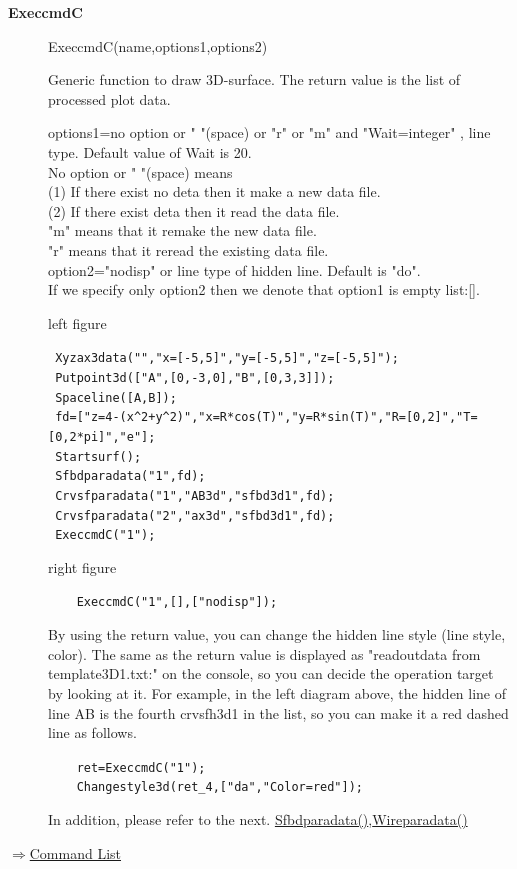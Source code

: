 \documentclass[papersize,a4paper,12pt]{article}
\newenvironment{cmd}[2]{
\hypertarget{#2}{}
\begin{center}{\bf\large #1}\end{center}
\begin{description}
}{
\end{description}
\begin{flushright} \hyperlink{functionlist}{$\Rightarrow$Command List}\end{flushright}
}
\newcommand{\itemket}[1]{
\item[\Ltab{27mm}{#1}]
}
\begin{document}
\begin{cmd}{ExeccmdC}{execcmdc}

\itemket{Usage}ExeccmdC(name,options1,options2)
\itemket{Description}Generic function to draw 3D-surface. The return value is the list of processed plot data.
\itemket{Details}options1=no option or " "(space) or "r" or "m" and "Wait=integer" , line type. Default value of Wait is 20.\\
No option or " "(space) means\\
(1) If there exist no deta then it make a new data file.\\
(2) If there exist deta then it read the data file.\\
"m" means that it remake the new data file.\\
"r" means that it reread the existing data file.\\

option2="nodisp" or line type of hidden line. Default is "do".\\

If we specify only option2 then we denote that option1 is empty list:[].
\itemket{Examples}  \mbox{}

left figure

\verb| Xyzax3data("","x=[-5,5]","y=[-5,5]","z=[-5,5]"); |\\
\verb| Putpoint3d(["A",[0,-3,0],"B",[0,3,3]]); |\\
\verb| Spaceline([A,B]); |\\
\verb| fd=["z=4-(x^2+y^2)","x=R*cos(T)","y=R*sin(T)","R=[0,2]","T=[0,2*pi]","e"]; |\\
\verb| Startsurf(); |\\
\verb| Sfbdparadata("1",fd); |\\
\verb| Crvsfparadata("1","AB3d","sfbd3d1",fd); |\\
\verb| Crvsfparadata("2","ax3d","sfbd3d1",fd); |\\
\verb| ExeccmdC("1"); |

right figure

\verb|    ExeccmdC("1",[],["nodisp"]);|

\hspace{20mm} \hspace{20mm}    

By using the return value, you can change the hidden line style (line style, color). 
The same as the return value is displayed as "readoutdata from template3D1.txt:" on the console, so you can decide the operation target by looking at it. For example, in the left diagram above, the hidden line of line AB is the fourth crvsfh3d1 in the list, so you can make it a red dashed line as follows.

\verb|    ret=ExeccmdC("1");|\\
\verb|    Changestyle3d(ret_4,["da","Color=red"]);|\\

\hspace{20mm} 

In addition, please refer to the next. \hyperlink{sfbdparadata}{Sfbdparadata()},\hyperlink{wireparadata}{Wireparadata()} 

\end{cmd}
\end{document}
